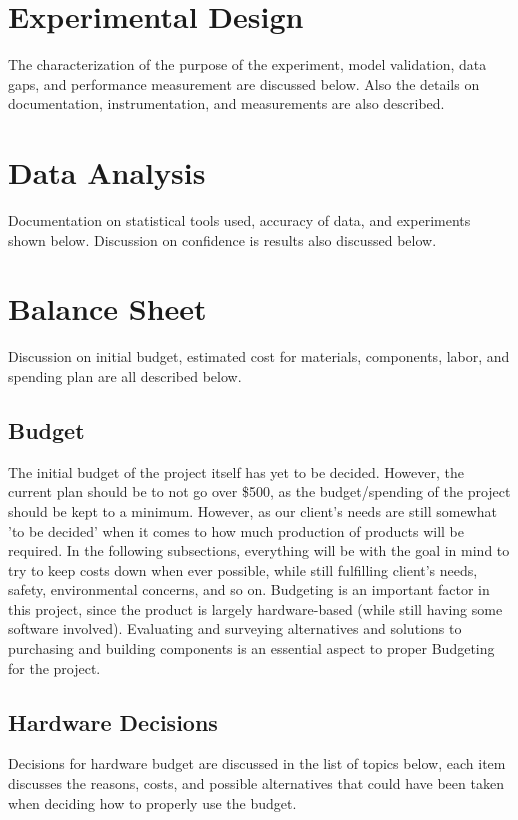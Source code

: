 \documentclass[12pt]{article}
\begin{document}
{	\newpage

\section{Experimental Design}
	The characterization of the purpose of the experiment, model validation, data gaps, and performance measurement are discussed below. Also the details on documentation, instrumentation, and measurements are also described.
  	
	\newpage	
  	
\section{Data Analysis}
	Documentation on statistical tools used, accuracy of data, and experiments shown below. Discussion on confidence is results also discussed below.

	\newpage

\section{Balance Sheet}
Discussion on initial budget, estimated cost for materials, components, labor, and spending plan are all described below.

		\subsection{Budget}
		The initial budget of the project itself has yet to be decided. However, the current plan should be to not go over \$500, as the budget/spending of the project should be kept to a minimum. However, as our client's needs are still somewhat 'to be decided' when it comes to how much production of products will be required. In the following subsections, everything will be with the goal in mind to try to keep costs down when ever possible, while still fulfilling client's needs, safety, environmental concerns, and so on. Budgeting is an important factor in this project, since the product is largely hardware-based (while still having some software involved). Evaluating and surveying alternatives and solutions to purchasing and building components is an essential aspect to proper Budgeting for the project.
		
		\subsection{Hardware Decisions}
		Decisions for hardware budget are discussed in the list of topics below, each item discusses the reasons, costs, and possible alternatives that could have been taken when deciding how to properly use the budget.

}
\end{document}
